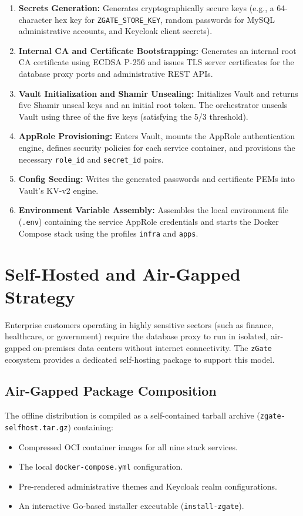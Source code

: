 \begin{enumerate}
    \item \textbf{Secrets Generation:} Generates cryptographically secure keys (e.g., a 64-character hex key for \texttt{ZGATE\_STORE\_KEY}, random passwords for MySQL administrative accounts, and Keycloak client secrets).
    \item \textbf{Internal CA and Certificate Bootstrapping:} Generates an internal root CA certificate using ECDSA P-256 and issues TLS server certificates for the database proxy ports and administrative REST APIs.
    \item \textbf{Vault Initialization and Shamir Unsealing:} Initializes Vault and returns five Shamir unseal keys and an initial root token. The orchestrator unseals Vault using three of the five keys (satisfying the 5/3 threshold).
    \item \textbf{AppRole Provisioning:} Enters Vault, mounts the AppRole authentication engine, defines security policies for each service container, and provisions the necessary \texttt{role\_id} and \texttt{secret\_id} pairs.
    \item \textbf{Config Seeding:} Writes the generated passwords and certificate PEMs into Vault's KV-v2 engine.
    \item \textbf{Environment Variable Assembly:} Assembles the local environment file (\texttt{.env}) containing the service AppRole credentials and starts the Docker Compose stack using the profiles \texttt{infra} and \texttt{apps}.
\end{enumerate}

\section{Self-Hosted and Air-Gapped Strategy}
Enterprise customers operating in highly sensitive sectors (such as finance, healthcare, or government) require the database proxy to run in isolated, air-gapped on-premises data centers without internet connectivity. The \texttt{zGate} ecosystem provides a dedicated self-hosting package to support this model.

\subsection{Air-Gapped Package Composition}
The offline distribution is compiled as a self-contained tarball archive (\texttt{zgate-selfhost.tar.gz}) containing:
\begin{itemize}
    \item Compressed OCI container images for all nine stack services.
    \item The local \texttt{docker-compose.yml} configuration.
    \item Pre-rendered administrative themes and Keycloak realm configurations.
    \item An interactive Go-based installer executable (\texttt{install-zgate}).
\end{itemize}

